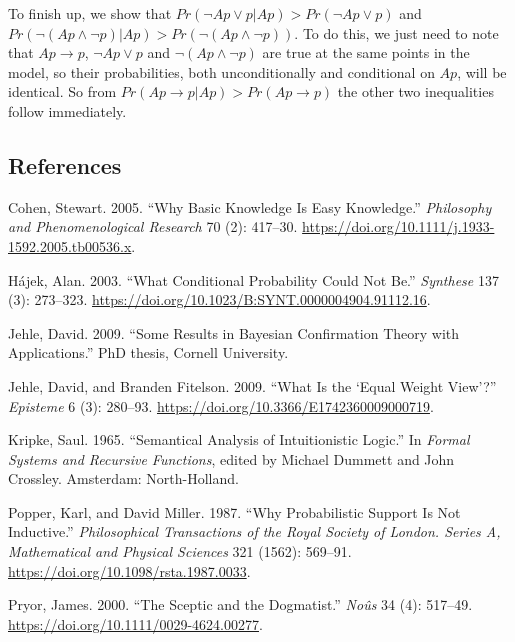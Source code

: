 \documentclass[
  11pt,
  letterpaper,
  DIV=11,
  numbers=noendperiod,
  oneside]{scrartcl}
\newlength{\cslhangindent}
\newenvironment{CSLReferences}[2] %
 {\begin{list}{}{%
  \setlength{\itemindent}{0pt}
  \setlength{\leftmargin}{0pt}
  \setlength{\parsep}{0pt}
  \ifodd #1
   \setlength{\leftmargin}{\cslhangindent}
   \setlength{\itemindent}{-1\cslhangindent}
  \fi
  \setlength{\itemsep}{#2\baselineskip}}}
 {\end{list}}
\begin{document}
To finish up, we show that
\(Pr(\neg Ap \vee p | Ap) > Pr(\neg Ap \vee p)\) and
\(Pr(\neg(Ap \wedge \neg p) | Ap) > Pr(\neg(Ap \wedge \neg p))\). To do
this, we just need to note that \(Ap \rightarrow p\), \(\neg Ap \vee p\)
and \(\neg(Ap \wedge \neg p)\) are true at the same points in the model,
so their probabilities, both unconditionally and conditional on \(Ap\),
will be identical. So from
\(Pr(Ap \rightarrow p | Ap) > Pr(Ap \rightarrow p)\) the other two
inequalities follow immediately.

\subsection*{References}\label{references}

\label{refs}
\begin{CSLReferences}{1}{0}
Cohen, Stewart. 2005. {``Why Basic Knowledge Is Easy Knowledge.''}
\emph{Philosophy and Phenomenological Research} 70 (2): 417--30.
\url{https://doi.org/10.1111/j.1933-1592.2005.tb00536.x}.

Hájek, Alan. 2003. {``What Conditional Probability Could Not Be.''}
\emph{Synthese} 137 (3): 273--323.
\url{https://doi.org/10.1023/B:SYNT.0000004904.91112.16}.

Jehle, David. 2009. {``Some Results in Bayesian Confirmation Theory with
Applications.''} PhD thesis, Cornell University.

Jehle, David, and Branden Fitelson. 2009. {``What Is the {`Equal Weight
View'}?''} \emph{Episteme} 6 (3): 280--93.
\url{https://doi.org/10.3366/E1742360009000719}.

Kripke, Saul. 1965. {``Semantical Analysis of Intuitionistic Logic.''}
In \emph{Formal Systems and Recursive Functions}, edited by Michael
Dummett and John Crossley. Amsterdam: North-Holland.

Popper, Karl, and David Miller. 1987. {``Why Probabilistic Support Is
Not Inductive.''} \emph{Philosophical Transactions of the Royal Society
of London. Series A, Mathematical and Physical Sciences} 321 (1562):
569--91. \url{https://doi.org/10.1098/rsta.1987.0033}.

Pryor, James. 2000. {``The Sceptic and the Dogmatist.''} \emph{No{û}s}
34 (4): 517--49. \url{https://doi.org/10.1111/0029-4624.00277}.


\end{CSLReferences}
\end{document}
